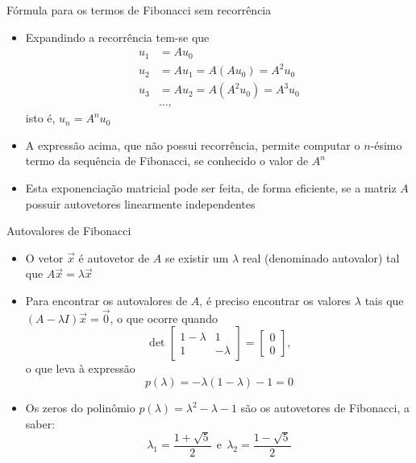\begin{frame}[fragile]{Fórmula para os termos de Fibonacci sem recorrência}

    \begin{itemize}
        \item Expandindo a recorrência tem-se que
        \begin{align*}
            u_1 &= Au_0 \\
            u_2 &= Au_1 = A(Au_0) = A^2u_0 \\
            u_3 &= Au_2 = A(A^2u_0) = A^3u_0 \\
            & \ldots,
        \end{align*}
        isto é, $u_n = A^nu_0$
        
        \item A expressão acima, que não possui recorrência, 
            permite computar o $n$-ésimo termo da sequência de Fibonacci,
            se conhecido o valor de $A^n$

        \item Esta exponenciação matricial pode ser feita, de forma eficiente, se a matriz
            $A$ possuir autovetores linearmente independentes
    \end{itemize}

\end{frame}

\begin{frame}[fragile]{Autovalores de Fibonacci}

    \begin{itemize}
        \item O vetor $\vec{x}$ é autovetor de $A$ se existir um $\lambda$ real (denominado
            autovalor) tal que $A\vec{x} = \lambda \vec{x}$

        \item Para encontrar os autovalores de $A$, é preciso encontrar os valores $\lambda$
            tais que $(A - \lambda I)\vec{x} = \vec{0}$, o que ocorre quando
        \[
             \det \begin{bmatrix} 1 - \lambda & 1 \\ 1 & -\lambda \end{bmatrix} = 
             \begin{bmatrix} 0 \\ 0\end{bmatrix},
        \] o que leva à expressão
        \[
            p(\lambda) = -\lambda(1 - \lambda) - 1 = 0
        \]

        \item Os zeros do polinômio $p(\lambda) = \lambda^2 - \lambda - 1$ são os autovetores
            de Fibonacci, a saber:
        \[
             \lambda_1 = \frac{1 + \sqrt{5}}{2}\ \ \mbox{e}\ \ 
             \lambda_2 = \frac{1 - \sqrt{5}}{2}
        \]
            
    \end{itemize}

\end{frame}

